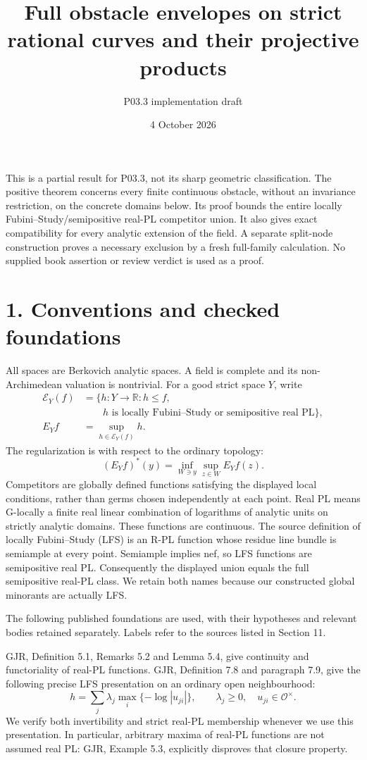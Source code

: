 \documentclass[11pt]{article}
\title{Full obstacle envelopes on strict rational curves and their projective products}
\author{P03.3 implementation draft}
\date{4 October 2026}
\begin{document}
\maketitle

This is a partial result for P03.3, not its sharp geometric classification. The positive theorem concerns every finite continuous obstacle, without an invariance restriction, on the concrete domains below. Its proof bounds the entire locally Fubini--Study/semipositive real-PL competitor union. It also gives exact compatibility for every analytic extension of the field. A separate split-node construction proves a necessary exclusion by a fresh full-family calculation. No supplied book assertion or review verdict is used as a proof.

\section*{1. Conventions and checked foundations}

All spaces are Berkovich analytic spaces. A field is complete and its non-Archimedean valuation is nontrivial. For a good strict space \(Y\), write
\[
\begin{aligned}
\mathcal E_Y(f)&=\{h:Y\longrightarrow\mathbb R:h\leq f,\\
&\hspace{2em}h\text{ is locally Fubini--Study or semipositive real PL}\},\\
E_Yf&=\sup_{h\in\mathcal E_Y(f)}h.
\end{aligned}
\]
The regularization is with respect to the ordinary topology:
\[
(E_Yf)^*(y)=\inf_{W\ni y}\sup_{z\in W}E_Yf(z).
\]
Competitors are globally defined functions satisfying the displayed local conditions, rather than germs chosen independently at each point. Real PL means G-locally a finite real linear combination of logarithms of analytic units on strictly analytic domains. These functions are continuous. The source definition of locally Fubini--Study (LFS) is an R-PL function whose residue line bundle is semiample at every point. Semiample implies nef, so LFS functions are semipositive real PL. Consequently the displayed union equals the full semipositive real-PL class. We retain both names because our constructed global minorants are actually LFS.

The following published foundations are used, with their hypotheses and relevant bodies retained separately. Labels refer to the sources listed in Section 11.

GJR, Definition 5.1, Remarks 5.2 and Lemma 5.4, give continuity and functoriality of real-PL functions. GJR, Definition 7.8 and paragraph 7.9, give the following precise LFS presentation on an ordinary open neighbourhood:
\[
h=\sum_j\lambda_j\max_i\{-\log|u_{ji}|\},
\qquad \lambda_j\geq0,\quad u_{ji}\in\mathcal O^\times.
\]
We verify both invertibility and strict real-PL membership whenever we use this presentation. In particular, arbitrary maxima of real-PL functions are not assumed real PL: GJR, Example 5.3, explicitly disproves that closure property.
\end{document}
